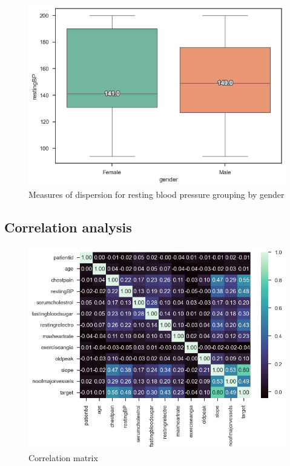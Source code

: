 \begin{figure}
    \caption{Measures of dispersion for resting blood pressure grouping by gender}\label{boxplot-bp-gender}
    \centering
    \includegraphics[width=\linewidth]{media/boxplot-08-gender-bp.png}
\end{figure}


\subsection{Correlation analysis}

\begin{figure}
    \caption{Correlation matrix}\label{correlation-matrix}
    \centering
    \includegraphics[width=\linewidth]{media/correlation-matrix.png}
\end{figure}